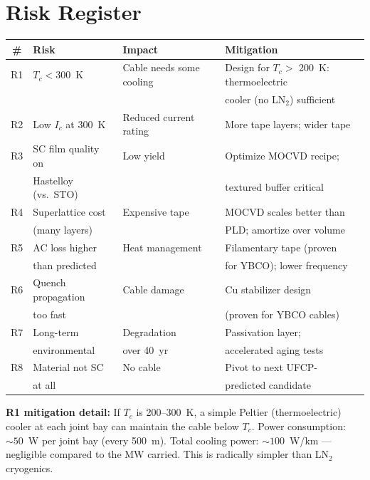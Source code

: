 \documentclass[11pt, a4paper]{article}
\begin{document}
\section{Risk Register}
\label{sec:risks}

\begin{center}
\begin{tabular}{@{}clll@{}}
\toprule
\textbf{\#} & \textbf{Risk} & \textbf{Impact} & \textbf{Mitigation} \\
\midrule
R1 & $T_c < 300$~K & Cable needs some cooling & Design for $T_c >$
    200~K: thermoelectric \\
   & & & cooler (no LN$_2$) sufficient \\
R2 & Low $I_c$ at 300~K & Reduced current rating & More tape layers;
    wider tape \\
R3 & SC film quality on & Low yield & Optimize MOCVD recipe; \\
   & Hastelloy (vs.\ STO) & & textured buffer critical \\
R4 & Superlattice cost & Expensive tape & MOCVD scales better than \\
   & (many layers) & & PLD; amortize over volume \\
R5 & AC loss higher & Heat management & Filamentary tape (proven \\
   & than predicted & & for YBCO); lower frequency \\
R6 & Quench propagation & Cable damage & Cu stabilizer design \\
   & too fast & & (proven for YBCO cables) \\
R7 & Long-term & Degradation & Passivation layer; \\
   & environmental & over 40~yr & accelerated aging tests \\
R8 & Material not SC & No cable & Pivot to next UFCP- \\
   & at all & & predicted candidate \\
\bottomrule
\end{tabular}
\end{center}

\textbf{R1 mitigation detail:} If $T_c$ is 200--300~K, a simple
Peltier (thermoelectric) cooler at each joint bay can maintain the
cable below $T_c$. Power consumption: $\sim 50$~W per joint bay
(every 500~m). Total cooling power: $\sim 100$~W/km --- negligible
compared to the MW carried. This is radically simpler than LN$_2$
cryogenics.
\end{document}
